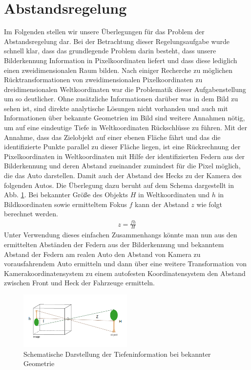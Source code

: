 \documentclass[10pt]{article}
\begin{document}
\section{Abstandsregelung}\label{sec:Abstandsreglung}
Im Folgenden stellen wir unsere Überlegungen für das Problem der Abstandsregelung dar.
Bei der Betrachtung dieser Regelungsaufgabe wurde schnell klar, dass das grundlegende Problem darin besteht, dass unsere Bilderkennung Information in Pixelkoordinaten liefert und dass diese lediglich einen zweidimensionalen Raum bilden.
Nach einiger Recherche zu möglichen Rücktransformationen von zweidimensionalen Pixelkoordinaten zu dreidimensionalen Weltkoordinaten war die Problematik dieser Aufgabenstellung um so deutlicher.
Ohne zusätzliche Informationen darüber was in dem Bild zu sehen ist, sind direkte analytische Lösungen nicht vorhanden und auch mit Informationen über bekannte Geometrien im Bild sind weitere Annahmen nötig, um auf eine eindeutige Tiefe in Weltkoordinaten Rückschlüsse zu führen.
Mit der Annahme, dass das Zielobjekt auf einer ebenen Fläche fährt und das die identifizierte Punkte parallel zu dieser Fläche liegen, ist eine Rückrechnung der Pixelkoordinaten in Weltkoordinaten mit Hilfe der identifizierten Federn aus der Bilderkennung und deren Abstand zueinander zumindest für die Pixel möglich, die das Auto darstellen.
Damit auch der Abstand des Hecks zu der Kamera des folgenden Autos.
Die Überlegung dazu beruht auf dem Schema dargestellt in Abb.
\ref{fig:reifenradius}.
Bei bekannter Größe des Objekts $H$ in Weltkoordinaten und $h$ in Bildkoordinaten sowie ermitteltem Fokus $f$ kann der Abstand $z$ wie folgt berechnet werden.
\begin{eqnarray}
z = \frac{fh}{H}
\end{eqnarray}
Unter Verwendung dieses einfachen Zusammenhangs könnte man nun aus den ermittelten Abständen der Federn aus der Bilderkennung und bekanntem Abstand der Federn am realen Auto den Abstand von Kamera zu vorausfahrendem Auto ermitteln und dann über eine weitere Transformation von Kamerakoordinatensystem zu einem autofesten Koordinatensystem den Abstand zwischen Front und Heck der Fahrzeuge ermitteln.\\
\begin{figure}[hbtp]
    \centering
    \includegraphics[width=0.5\textwidth]{Pinholeobject_label}
    \caption{Schematische Darstellung der Tiefeninformation bei bekannter Geometrie}
    \label{fig:reifenradius}
\end{figure}
\end{document}
